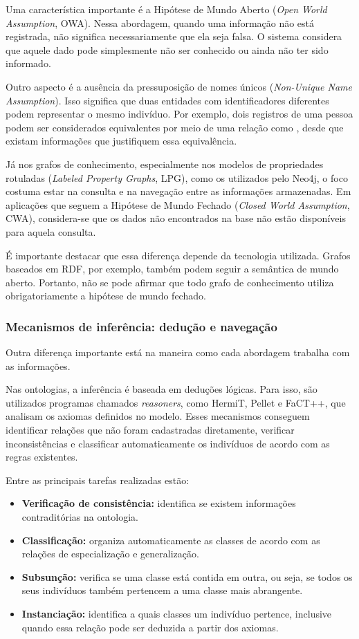 \documentclass[12pt, a4paper]{article}
\DeclareRobustCommand{\texttt}[1]{\breakabletexttt{#1}}
\begin{document}
Uma característica importante é a Hipótese de Mundo Aberto (\textit{Open World Assumption}, OWA). Nessa abordagem, quando uma informação não está registrada, não significa necessariamente que ela seja falsa. O sistema considera que aquele dado pode simplesmente não ser conhecido ou ainda não ter sido informado.

Outro aspecto é a ausência da pressuposição de nomes únicos (\textit{Non-Unique Name Assumption}). Isso significa que duas entidades com identificadores diferentes podem representar o mesmo indivíduo. Por exemplo, dois registros de uma pessoa podem ser considerados equivalentes por meio de uma relação como \texttt{owl:sameAs}, desde que existam informações que justifiquem essa equivalência.

Já nos grafos de conhecimento, especialmente nos modelos de propriedades rotuladas (\textit{Labeled Property Graphs}, LPG), como os utilizados pelo Neo4j, o foco costuma estar na consulta e na navegação entre as informações armazenadas. Em aplicações que seguem a Hipótese de Mundo Fechado (\textit{Closed World Assumption}, CWA), considera-se que os dados não encontrados na base não estão disponíveis para aquela consulta.

É importante destacar que essa diferença depende da tecnologia utilizada. Grafos baseados em RDF, por exemplo, também podem seguir a semântica de mundo aberto. Portanto, não se pode afirmar que todo grafo de conhecimento utiliza obrigatoriamente a hipótese de mundo fechado.

\subsubsection{Mecanismos de inferência: dedução e navegação}

Outra diferença importante está na maneira como cada abordagem trabalha com as informações.

Nas ontologias, a inferência é baseada em deduções lógicas. Para isso, são utilizados programas chamados \textit{reasoners}, como HermiT, Pellet e FaCT++, que analisam os axiomas definidos no modelo. Esses mecanismos conseguem identificar relações que não foram cadastradas diretamente, verificar inconsistências e classificar automaticamente os indivíduos de acordo com as regras existentes.

Entre as principais tarefas realizadas estão:
\begin{itemize}[leftmargin=2em]
  \item \textbf{Verificação de consistência:} identifica se existem informações contraditórias na ontologia.
  \item \textbf{Classificação:} organiza automaticamente as classes de acordo com as relações de especialização e generalização.
  \item \textbf{Subsunção:} verifica se uma classe está contida em outra, ou seja, se todos os seus indivíduos também pertencem a uma classe mais abrangente.
  \item \textbf{Instanciação:} identifica a quais classes um indivíduo pertence, inclusive quando essa relação pode ser deduzida a partir dos axiomas.
\end{itemize}
\end{document}
